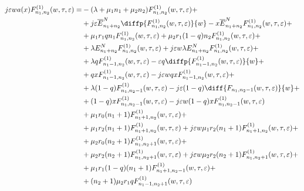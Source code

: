  \begin{equation}
 	\begin{split}
 	    j\varepsilon wa(x) F_{n_{1}, n_{2}}^{(1)}(w,\tau,\varepsilon)=
 		&-(\lambda+\mu_{1}n_{1}+\mu_{2}n_{2})F_{n_{1}, n_{2}}^{(1)}(w,\tau,\varepsilon) +\\
 		&+ j\varepsilon \overline{E}_{n_{1}+n_{2}}^N\diffp{F_{n_{1}, n_{2}}^{(1)}(w,\tau,\varepsilon)}{w}-x\overline{E}_{n_{1}+n_{2}}^NF_{n_{1}, n_{2}}^{(1)}(w,\tau,\varepsilon)+\\
 		&+\mu_{1}r_{1}q n_{1}F_{n_{1}, n_{2}}^{(1)}(w,\tau,\varepsilon)+ \mu_{2}r_{1}(1-q)n_{2}F_{n_{1}, n_{2}}^{(1)}(w,\tau,\varepsilon)+\\
 		&+ \lambda E_{n_{1}+n_{2}}^N F_{n_{1}, n_{2}}^{(1)}(w,\tau,\varepsilon)+j\varepsilon w \lambda E_{n_{1}+n_{2}}^N F_{n_{1}, n_{2}}^{(1)}(w,\tau,\varepsilon)+\\
 		&+\lambda qF_{n_{1}-1, n_{2}}^{(1)}(w,\tau,\varepsilon) -  \varepsilon q  \diffp{F_{n_{1}-1, n_{2}}^{(1)}(w,\tau,\varepsilon)}{w}+\\
 		&+ q  xF_{n_{1}-1, n_{2}}^{(1)}(w,\tau,\varepsilon)-j\varepsilon wq xF_{n_{1}-1, n_{2}}^{(1)}(w,\tau,\varepsilon)+\\
 		&+\lambda (1-q)F_{n_{1}, n_{2}-1}^{(1)}(w,\tau,\varepsilon) - j \varepsilon (1-q) \diff{F_{n_{1}, n_{2}-1}(w,\tau,\varepsilon)}{w}+\\
 		&+ (1-q) x F_{n_{1}, n_{2}-1}^{(1)}(w,\tau,\varepsilon)-j\varepsilon w(1-q) x F_{n_{1}, n_{2}-1}^{(1)}(w,\tau,\varepsilon)\\
 		&+ \mu_{1} r_{0}(n_{1}+1) F_{n_{1} +1 , n_{2}}^{(1)}(w,\tau,\varepsilon)+\\
 		& + \mu_{1} r_{2}(n_{1}+1)F_{n_{1} + 1, n_{2}}^{(1)}(w,\tau,\varepsilon)+j\varepsilon w\mu_{1} r_{2}(n_{1}+1)F_{n_{1} + 1, n_{2}}^{(1)}(w,\tau,\varepsilon)+\\
 		&+ \mu_{2} r_{0}(n_{2}+1) F_{n_{1}, n_{2} + 1 }^{(1)}(w,\tau,\varepsilon)+\\
 		& + \mu_{2} r_{2} (n_{2}+1) F_{n_{1}, n_{2} + 1}^{(1)}(w,\tau,\varepsilon)+j\varepsilon w\mu_{2} r_{2} (n_{2}+1) F_{n_{1}, n_{2} + 1}^{(1)}(w,\tau,\varepsilon)+\\
 		&+\mu_{1} r_{1}(1-q)(n_{1}+1) F_{n_{1} +1 , n_{2}-1}^{(1)}(w,\tau,\varepsilon)+\\
 		&+(n_{2}+1)\mu_{2} r_{1}q F_{n_{1} -1 , n_{2}+1}^{(1)}(w,\tau,\varepsilon) 
 	\end{split}
 \end{equation}